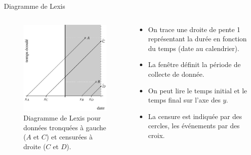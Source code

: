 \documentclass[
  ignorenonframetext,
]{beamer}
\providecommand{\tightlist}{%
  \setlength{\itemsep}{0pt}\setlength{\parskip}{0pt}}\usepackage{longtable,booktabs,array}
\begin{document}
\begin{frame}{Diagramme de Lexis}
\protect\hypertarget{diagramme-de-lexis}{}
\begin{columns}[T]
\begin{column}{0.5\textwidth}
\begin{figure}

{\centering \includegraphics{figures/Lexis_censure.pdf}

}

\caption{Diagramme de Lexis pour données tronquées à gauche (\(A\) et
\(C\)) et censurées à droite (\(C\) et \(D\)).}

\end{figure}
\end{column}

\begin{column}{0.4\textwidth}
\begin{itemize}
\tightlist
\item
  On trace une droite de pente 1 représentant la durée en fonction du
  temps (date au calendrier).
\item
  La fenêtre définit la période de collecte de donnée.
\item
  On peut lire le temps initial et le temps final sur l'axe des \(y\).
\item
  La censure est indiquée par des cercles, les événements par des croix.
\end{itemize}
\end{column}
\end{columns}
\end{frame}
\end{document}
